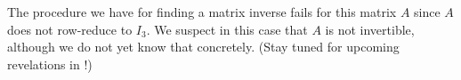 The procedure we have for finding a matrix inverse fails for this matrix $A$ since $A$ does not row-reduce to $I_3$.  We suspect in this case that $A$ is not invertible, although we do not yet know that concretely.  (Stay tuned for upcoming revelations in !)
